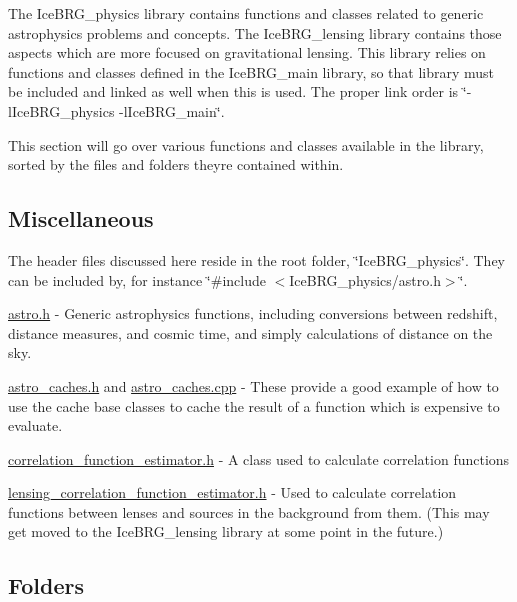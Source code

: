 The Ice\+B\+R\+G\+\_\+physics library contains functions and classes related to generic astrophysics problems and concepts. The Ice\+B\+R\+G\+\_\+lensing library contains those aspects which are more focused on gravitational lensing. This library relies on functions and classes defined in the Ice\+B\+R\+G\+\_\+main library, so that library must be included and linked as well when this is used. The proper link order is \char`\"{}-\/l\+Ice\+B\+R\+G\+\_\+physics
-\/l\+Ice\+B\+R\+G\+\_\+main\char`\"{}.

This section will go over various functions and classes available in the library, sorted by the files and folders they\textquotesingle{}re contained within.

\subsection*{Miscellaneous}

The header files discussed here reside in the root folder, \char`\"{}\+Ice\+B\+R\+G\+\_\+physics\char`\"{}. They can be included by, for instance \char`\"{}\#include $<$\+Ice\+B\+R\+G\+\_\+physics/astro.\+h$>$\char`\"{}.


\begin{DoxyItemize}
\item \hyperlink{astro_8h}{astro.\+h} -\/ Generic astrophysics functions, including conversions between redshift, distance measures, and cosmic time, and simply calculations of distance on the sky.
\item \hyperlink{astro__caches_8h}{astro\+\_\+caches.\+h} and \hyperlink{astro__caches_8cpp}{astro\+\_\+caches.\+cpp} -\/ These provide a good example of how to use the cache base classes to cache the result of a function which is expensive to evaluate.
\item \hyperlink{correlation__function__estimator_8h}{correlation\+\_\+function\+\_\+estimator.\+h} -\/ A class used to calculate correlation functions
\item \hyperlink{lensing__correlation__function__estimator_8h}{lensing\+\_\+correlation\+\_\+function\+\_\+estimator.\+h} -\/ Used to calculate correlation functions between lenses and sources in the background from them. (This may get moved to the Ice\+B\+R\+G\+\_\+lensing library at some point in the future.)
\end{DoxyItemize}

\subsection*{Folders}

